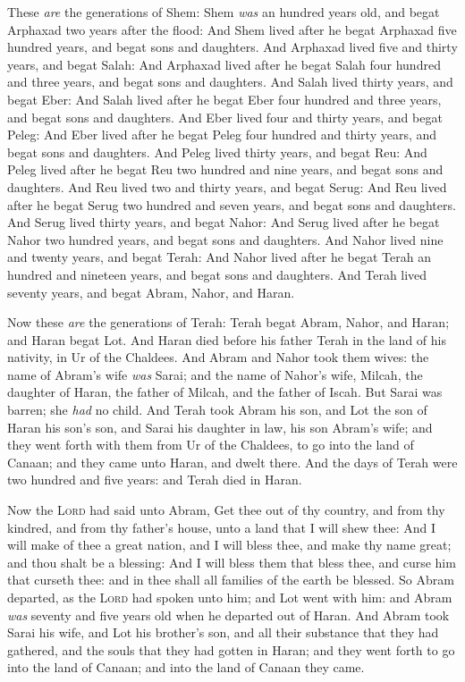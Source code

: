 \documentclass[11pt,letterpaper,oneside]{memoir}
\begin{document}
These \emph{are} the generations of Shem: Shem \emph{was} an hundred
years old, and begat Arphaxad two years after the flood: And Shem lived
after he begat Arphaxad five hundred years, and begat sons and
daughters. And Arphaxad lived five and thirty years, and begat Salah:
And Arphaxad lived after he begat Salah four hundred and three years,
and begat sons and daughters. And Salah lived thirty years, and begat
Eber: And Salah lived after he begat Eber four hundred and three years,
and begat sons and daughters. And Eber lived four and thirty years, and
begat Peleg: And Eber lived after he begat Peleg four hundred and thirty
years, and begat sons and daughters. And Peleg lived thirty years, and
begat Reu: And Peleg lived after he begat Reu two hundred and nine
years, and begat sons and daughters. And Reu lived two and thirty years,
and begat Serug: And Reu lived after he begat Serug two hundred and
seven years, and begat sons and daughters. And Serug lived thirty years,
and begat Nahor: And Serug lived after he begat Nahor two hundred years,
and begat sons and daughters. And Nahor lived nine and twenty years, and
begat Terah: And Nahor lived after he begat Terah an hundred and
nineteen years, and begat sons and daughters. And Terah lived seventy
years, and begat Abram, Nahor, and Haran.

Now these \emph{are} the generations of Terah: Terah begat Abram, Nahor,
and Haran; and Haran begat Lot. And Haran died before his father Terah
in the land of his nativity, in Ur of the Chaldees. And Abram and Nahor
took them wives: the name of Abram's wife \emph{was} Sarai; and the name
of Nahor's wife, Milcah, the daughter of Haran, the father of Milcah,
and the father of Iscah. But Sarai was barren; she \emph{had} no child.
And Terah took Abram his son, and Lot the son of Haran his son's son,
and Sarai his daughter in law, his son Abram's wife; and they went forth
with them from Ur of the Chaldees, to go into the land of Canaan; and
they came unto Haran, and dwelt there. And the days of Terah were two
hundred and five years: and Terah died in Haran.

Now the \textsc{Lord} had said unto Abram, Get thee out of thy country,
and from thy kindred, and from thy father's house, unto a land that I
will shew thee: And I will make of thee a great nation, and I will bless
thee, and make thy name great; and thou shalt be a blessing: And I will
bless them that bless thee, and curse him that curseth thee: and in thee
shall all families of the earth be blessed. So Abram departed, as the
\textsc{Lord} had spoken unto him; and Lot went with him: and Abram
\emph{was} seventy and five years old when he departed out of Haran. And
Abram took Sarai his wife, and Lot his brother's son, and all their
substance that they had gathered, and the souls that they had gotten in
Haran; and they went forth to go into the land of Canaan; and into the
land of Canaan they came.
\end{document}
